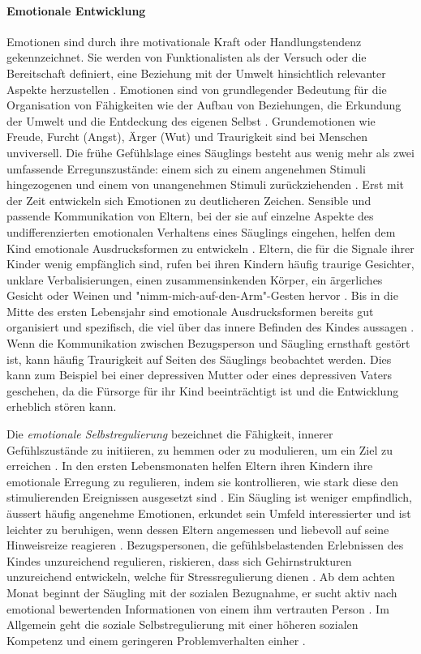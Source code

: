 \paragraph{Emotionale Entwicklung}\label{par:EmotionaleEntwicklung}
Emotionen sind durch ihre motivationale Kraft oder Handlungstendenz gekennzeichnet. Sie werden von Funktionalisten als der Versuch oder die Bereitschaft definiert, eine Beziehung mit der Umwelt hinsichtlich relevanter Aspekte herzustellen \cite[S.~529ff]{Siegler2008}. Emotionen sind von grundlegender Bedeutung für die Organisation von Fähigkeiten wie der Aufbau von Beziehungen, die Erkundung der Umwelt und die Entdeckung des eigenen Selbst \cite{Halle2003, Saarni2006}. Grundemotionen wie Freude, Furcht (Angst), Ärger (Wut) und Traurigkeit sind bei Menschen unviversell. Die frühe Gefühlslage eines Säuglings besteht aus wenig mehr als zwei umfassende Erregunszustände: einem sich zu einem angenehmen Stimuli hingezogenen und einem von unangenehmen Stimuli zurückziehenden \cite{Camras2003, Fox1991}. Erst mit der Zeit entwickeln sich Emotionen zu deutlicheren Zeichen. Sensible und passende Kommunikation von Eltern, bei der sie auf einzelne Aspekte des undifferenzierten emotionalen Verhaltens eines Säuglings eingehen, helfen dem Kind emotionale Ausdrucksformen zu entwickeln \cite{Gergely1999}. Eltern, die für die Signale ihrer Kinder wenig empfänglich sind, rufen bei ihren Kindern häufig traurige Gesichter, unklare Verbalisierungen, einen zusammensinkenden Körper, ein ärgerliches Gesicht oder Weinen und "nimm-mich-auf-den-Arm"-Gesten hervor \cite{Weinberg1994, Yale1999}. Bis in die Mitte des ersten Lebensjahr sind emotionale Ausdrucksformen bereits gut organisiert und spezifisch, die viel über das innere Befinden des Kindes aussagen \cite{Berk2011}. Wenn die Kommunikation zwischen Bezugsperson und Säugling ernsthaft gestört ist, kann häufig Traurigkeit auf Seiten des Säuglings beobachtet werden. Dies kann zum Beispiel bei einer depressiven Mutter oder eines depressiven Vaters geschehen, da die Fürsorge für ihr Kind beeinträchtigt ist und die Entwicklung erheblich stören kann.

Die \textit{emotionale Selbstregulierung} bezeichnet die Fähigkeit, innerer Gefühlszustände zu initiieren, zu hemmen oder zu modulieren, um ein Ziel zu erreichen \cite{Siegler2008}. In den ersten Lebensmonaten helfen Eltern ihren Kindern ihre emotionale Erregung zu regulieren, indem sie kontrollieren, wie stark diese den stimulierenden Ereignissen ausgesetzt sind \cite{Gianino1988}. Ein Säugling ist weniger empfindlich, äussert häufig angenehme Emotionen, erkundet sein Umfeld interessierter und ist leichter zu beruhigen, wenn dessen Eltern angemessen und liebevoll auf seine Hinweisreize reagieren \cite{Crockenberg2004}. Bezugspersonen, die gefühlsbelastenden Erlebnissen des Kindes unzureichend regulieren, riskieren, dass sich Gehirnstrukturen unzureichend entwickeln, welche für Stressregulierung dienen \cite[S.~250]{Berk2011}. Ab dem achten Monat beginnt der Säugling mit der sozialen Bezugnahme, er sucht aktiv nach emotional bewertenden Informationen von einem ihm vertrauten Person \cite{Mumme2007}. Im Allgemein geht die soziale Selbstregulierung mit einer höheren sozialen Kompetenz und einem geringeren Problemverhalten einher \cite[S.~580]{Siegler2008}. 

